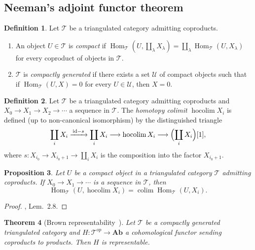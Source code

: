 \documentclass[12pt,a4paper]{article}
\newtheorem{theorem}{Theorem}[section]
\newtheorem{proposition}[theorem]{Proposition}
\theoremstyle{definition}
\newtheorem{definition}[theorem]{Definition}
\newcommand{\Ab}{\mathbf{Ab}}
\newcommand{\hocolim}{\operatorname*{hocolim}}
\newcommand{\colim}{\operatorname*{colim}}
\newcommand{\Hom}{\operatorname{Hom}}
\newcommand{\id}{\mathrm{id}}
\begin{document}
\subsection{Neeman's adjoint functor theorem}

\begin{definition}\label{def:compactly-generated}
Let $\mathcal{T}$ be a triangulated category admitting coproducts.
\begin{enumerate}
  \item An object $U\in\mathcal{T}$ is \emph{compact} if
    $\Hom_\mathcal{T}(U,\coprod_\lambda X_\lambda)
    =\coprod_\lambda\Hom_\mathcal{T}(U,X_\lambda)$
    for every coproduct of objects in $\mathcal{T}$.
  \item $\mathcal{T}$ is \emph{compactly generated} if there exists a set
    $\mathcal{U}$ of compact objects such that if
    $\Hom_\mathcal{T}(U,X)=0$ for every $U\in\mathcal{U}$, then $X=0$.
\end{enumerate}
\end{definition}

\begin{definition}\label{def:hocolim}
Let $\mathcal{T}$ be a triangulated category admitting coproducts and
$X_0\to X_1\to X_2\to\cdots$ a sequence in $\mathcal{T}$.  The
\emph{homotopy colimit} $\hocolim X_i$ is defined (up to non-canonical isomorphism)
by the distinguished triangle
\[
  \coprod_i X_i \xrightarrow{\,\id-s\,} \coprod_i X_i \longrightarrow \hocolim X_i
  \longrightarrow \Bigl(\coprod_i X_i\Bigr)[1],
\]
where $s:X_{i_0}\to X_{i_0+1}\to\coprod_i X_i$ is the composition into the factor
$X_{i_0+1}$.
\end{definition}

\begin{proposition}\label{prop:compact-hocolim}
Let $U$ be a compact object in a triangulated category $\mathcal{T}$ admitting
coproducts.  If $X_0\to X_1\to\cdots$ is a sequence in $\mathcal{T}$, then
\[
  \Hom_\mathcal{T}(U,\hocolim X_i) = \colim\Hom_\mathcal{T}(U,X_i).
\]
\end{proposition}
\begin{proof}
\cite{Nee96}, Lem.\ 2.8.
\end{proof}

\begin{theorem}[Brown representability~\cite{Nee96}]\label{thm:Brown}
Let $\mathcal{T}$ be a compactly generated triangulated category and
$H:\mathcal{T}^{op}\to\Ab$ a cohomological functor sending coproducts to products.
Then $H$ is representable.
\end{theorem}
\end{document}
